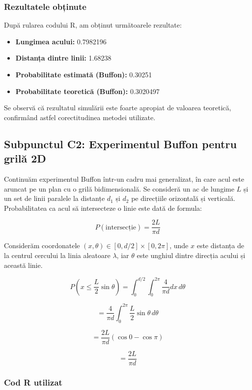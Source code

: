 \documentclass{article}
\begin{document}
\subsubsection*{Rezultatele obținute}

După rularea codului R, am obținut următoarele rezultate:

\begin{itemize}
    \item \textbf{Lungimea acului:} 0.7982196
    \item \textbf{Distanța dintre linii:} 1.68238
    \item \textbf{Probabilitate estimată (Buffon):} 0.30251
    \item \textbf{Probabilitate teoretică (Buffon):} 0.3020497
\end{itemize}

Se observă că rezultatul simulării este foarte apropiat de valoarea teoretică, confirmând astfel corectitudinea metodei utilizate.


\newpage

\subsection{Subpunctul C2: Experimentul Buffon pentru grilă 2D}

Continuăm experimentul Buffon într-un cadru mai generalizat, în care acul este aruncat pe un plan cu o grilă bidimensională. Se consideră un ac de lungime \( L \) și un set de linii paralele la distanțe \( d_1 \) și \( d_2 \) pe direcțiile orizontală și verticală. Probabilitatea ca acul să intersecteze o linie este dată de formula:

\[
P(\text{intersecție}) = \frac{2L}{\pi d}
\]

Considerăm coordonatele \((x, \theta) \in [0, d/2] \times [0, 2\pi]\), unde \( x \) este distanța de la centrul cercului la linia aleatoare \( \lambda \), iar \( \theta \) este unghiul dintre direcția acului și această linie.

\[
P\left(x \leq \frac{L}{2} \sin \theta \right) = \int_0^{d/2} \int_0^{2\pi} \frac{4}{\pi d} dx \, d\theta
\]

\[
= \frac{4}{\pi d} \int_0^{2\pi} \frac{L}{2} \sin \theta \, d\theta
\]

\[
= \frac{2L}{\pi d} \left( \cos 0 - \cos \pi \right)
\]

\[
= \frac{2L}{\pi d}
\]

\subsubsection*{Cod R utilizat}
\end{document}
